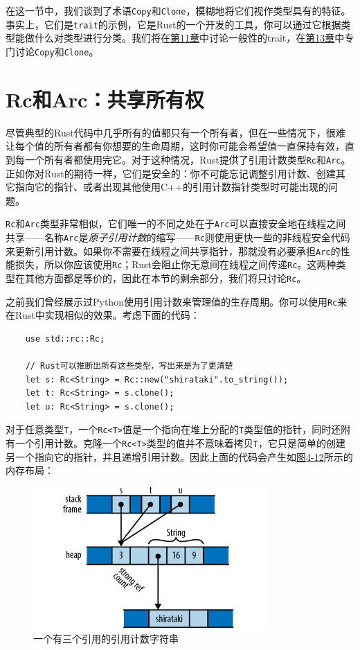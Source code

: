 在这一节中，我们谈到了术语\texttt{Copy}和\texttt{Clone}，模糊地将它们视作类型具有的特征。事实上，它们是\texttt{trait}的示例，它是Rust的一个开发的工具，你可以通过它根据类型能做什么对类型进行分类。我们将在\hyperref[ch11]{第11章}中讨论一般性的trait，在\hyperref[ch13]{第13章}中专门讨论\texttt{Copy}和\texttt{Clone}。

\section{Rc和Arc：共享所有权}\label{rc}

尽管典型的Rust代码中几乎所有的值都只有一个所有者，但在一些情况下，很难让每个值的所有者都有你想要的生命周期，这时你可能会希望值一直保持有效，直到每一个所有者都使用完它。对于这种情况，Rust提供了引用计数类型\texttt{Rc}和\texttt{Arc}。正如你对Rust的期待一样，它们是安全的：你不可能忘记调整引用计数、创建其它指向它的指针、或者出现其他使用C++的引用计数指针类型时可能出现的问题。

\texttt{Rc}和\texttt{Arc}类型非常相似，它们唯一的不同之处在于\texttt{Arc}可以直接安全地在线程之间共享——名称\texttt{Arc}是\emph{原子引用计数}的缩写——\texttt{Rc}则使用更快一些的非线程安全代码来更新引用计数。如果你不需要在线程之间共享指针，那就没有必要承担\texttt{Arc}的性能损失，所以你应该使用\texttt{Rc}；Rust会阻止你无意间在线程之间传递\texttt{Rc}。这两种类型在其他方面都是等价的，因此在本节的剩余部分，我们将只讨论\texttt{Rc}。

之前我们曾经展示过Python使用引用计数来管理值的生存周期。你可以使用\texttt{Rc}来在Rust中实现相似的效果。考虑下面的代码：
\begin{verbatim}
    use std::rc::Rc;

    // Rust可以推断出所有这些类型，写出来是为了更清楚
    let s: Rc<String> = Rc::new("shirataki".to_string());
    let t: Rc<String> = s.clone();
    let u: Rc<String> = s.clone();
\end{verbatim}

对于任意类型\texttt{T}，一个\texttt{Rc<T>}值是一个指向在堆上分配的\texttt{T}类型值的指针，同时还附有一个引用计数。克隆一个\texttt{Rc<T>}类型的值并不意味着拷贝\texttt{T}，它只是简单的创建另一个指向它的指针，并且递增引用计数。因此上面的代码会产生如\hyperref[f4-12]{图4-12}所示的内存布局：

\begin{figure}[htbp]
    \centering
    \includegraphics[width=0.8\textwidth]{../img/f4-12.png}
    \caption{一个有三个引用的引用计数字符串}
    \label{f4-12}
\end{figure}

